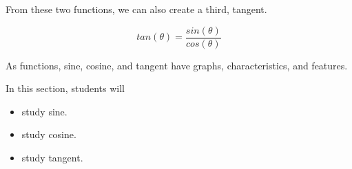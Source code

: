 \documentclass{ximera}
\begin{document}
From these two functions, we can also create a third, tangent.

\[       
tan(\theta) = \frac{sin(\theta)}{cos(\theta)}
\]



As functions, sine, cosine, and tangent have graphs, characteristics, and features.






















\begin{sectionOutcomes}
In this section, students will 

\begin{itemize}
\item study sine.
\item study cosine.
\item study tangent.
\end{itemize}
\end{sectionOutcomes}
\end{document}
